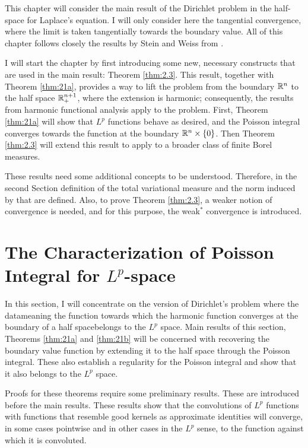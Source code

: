 This chapter will consider the main result of the Dirichlet problem in the half-space for Laplace's equation. I will only consider here the tangential convergence, where the limit is taken tangentially towards the boundary value. All of this chapter follows closely the results by Stein and Weiss from \cite{stein_weiss}.

I will start the chapter by first introducing some new, necessary constructs that are used in the main result: Theorem \ref{thm:2.3}. This result, together with Theorem \ref{thm:21a}, provides a way to lift the problem from the boundary $\mathbb R^n$ to the half space $\mathbb R^{n+1}_+$, where the extension is harmonic; consequently, the results from harmonic functional analysis apply to the problem. First, Theorem \ref{thm:21a} will show that $L^p$ functions behave as desired, and the Poisson integral converges towards the function at the boundary $\mathbb R^n\times\{0\}$. Then Theorem \ref{thm:2.3} will extend this result to apply to a broader class of finite Borel measures.

These results need some additional concepts to be understood. Therefore, in the second Section definition of the total variational measure and the norm induced by that are defined. Also, to prove Theorem \ref{thm:2.3}, a weaker notion of convergence is needed, and for this purpose, the weak$^*$ convergence is introduced.

\section{The Characterization of Poisson Integral for $L^p$-space}\label{sec:LP}

In this section, I will concentrate on the version of Dirichlet's problem where the data\textemdash meaning the function towards which the harmonic function converges at the boundary of a half space\textemdash belongs to the $L^p$ space. Main results of this section, Theorems \ref{thm:21a} and \ref{thm:21b} will be concerned with recovering the boundary value function by extending it to the half space through the Poisson integral. These also establish a regularity for the Poisson integral and show that it also belongs to the $L^p$ space.

Proofs for these theorems require some preliminary results. These are introduced before the main results. These results show that the convolutions of $L^p$ functions with functions that resemble good kernels as approximate identities will converge, in some cases pointwise and in other cases in the $L^p$ sense, to the function against which it is convoluted.

